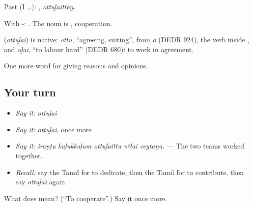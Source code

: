 Past (I …): , \emph{ottuḻaittēṉ}.

With -:  . The noun is , cooperation.

\begin{cousinweb}
\textbf{} (\emph{ottuḻai}) is native: \emph{ottu}, \textquotedblleft{}agreeing, suiting\textquotedblright{}, from \emph{o} (DEDR 924), the verb inside , and \emph{uḻai}, \textquotedblleft{}to labour hard\textquotedblright{} (DEDR 680): to work in agreement.
\end{cousinweb}

\begin{grammarlens}[title={What you've built}]
One more word for giving reasons and opinions.
\end{grammarlens}

\subsection*{Your turn}
\begin{itemize}
\raggedright
  \item \emph{Say it:} \emph{ottuḻai}
  \item \emph{Say it:} \emph{ottuḻai}, once more
  \item \emph{Say it:} \emph{iraṇṭu kuḻukkaḷum ottuḻaittu vēlai ceytaṉa.} — The two teams worked together.
  \item \emph{Recall:} say the Tamil for to dedicate, then the Tamil for to contribute, then say \emph{ottuḻai} again
\end{itemize}

\begin{tcolorbox}[breakable,colback=teal!4,colframe=teal!35!black,title={Before you move on}]
What does  mean? (\textquotedblleft{}To cooperate\textquotedblright{}.) Say it once more.
\end{tcolorbox}
